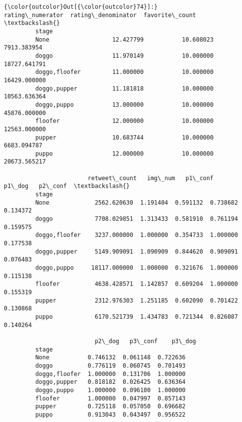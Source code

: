 \documentclass[11pt]{article}
\begin{document}
\begin{Verbatim}[commandchars=\\\{\}]
{\color{outcolor}Out[{\color{outcolor}74}]:}                rating\_numerator  rating\_denominator  favorite\_count  \textbackslash{}
         stage                                                                 
         None                  12.427799           10.608023     7913.383954   
         doggo                 11.970149           10.000000    18727.641791   
         doggo,floofer         11.000000           10.000000    16429.000000   
         doggo,pupper          11.181818           10.000000    10563.636364   
         doggo,puppo           13.000000           10.000000    45876.000000   
         floofer               12.000000           10.000000    12563.000000   
         pupper                10.683744           10.000000     6683.094787   
         puppo                 12.000000           10.000000    20673.565217   
         
                        retweet\_count   img\_num   p1\_conf    p1\_dog   p2\_conf  \textbackslash{}
         stage                                                                  
         None             2562.620630  1.191404  0.591132  0.738682  0.134372   
         doggo            7708.029851  1.313433  0.581910  0.761194  0.159575   
         doggo,floofer    3237.000000  1.000000  0.354733  1.000000  0.177538   
         doggo,pupper     5149.909091  1.090909  0.844620  0.909091  0.076483   
         doggo,puppo     18117.000000  1.000000  0.321676  1.000000  0.115138   
         floofer          4638.428571  1.142857  0.609204  1.000000  0.155319   
         pupper           2312.976303  1.251185  0.602090  0.701422  0.130868   
         puppo            6170.521739  1.434783  0.721344  0.826087  0.140264   
         
                          p2\_dog   p3\_conf    p3\_dog  
         stage                                        
         None           0.746132  0.061148  0.722636  
         doggo          0.776119  0.060745  0.701493  
         doggo,floofer  1.000000  0.131706  1.000000  
         doggo,pupper   0.818182  0.026425  0.636364  
         doggo,puppo    1.000000  0.096100  1.000000  
         floofer        1.000000  0.047997  0.857143  
         pupper         0.725118  0.057050  0.696682  
         puppo          0.913043  0.043497  0.956522  
\end{Verbatim}
            
\end{document}
